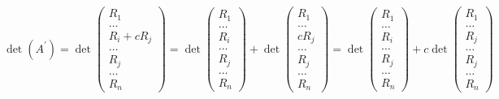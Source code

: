 \begin{equation}
  \det(A^\prime)=\det\begin{pmatrix}
                     R_1\\
                     \dots\\
                     R_i +cR_j\\
                     \dots\\
                     R_j\\
                     \dots\\
                     R_n
                   \end{pmatrix}=\det
                   \begin{pmatrix}
                     R_1\\
                     \dots\\
                     R_i\\
                     \dots\\
                     R_j\\
                     \dots\\
                     R_n
                   \end{pmatrix}+\det
                   \begin{pmatrix}
                     R_1\\
                     \dots\\
                     cR_j\\
                     \dots\\
                     R_j\\
                     \dots\\
                     R_n
                   \end{pmatrix}=\det
                   \begin{pmatrix}
                     R_1\\
                     \dots\\
                     R_i\\
                     \dots\\
                     R_j\\
                     \dots\\
                     R_n
                   \end{pmatrix}+c\det
                   \begin{pmatrix}
                     R_1\\
                     \dots\\
                     R_j\\
                     \dots\\
                     R_j\\
                     \dots\\
                     R_n
                   \end{pmatrix}
\end{equation}
